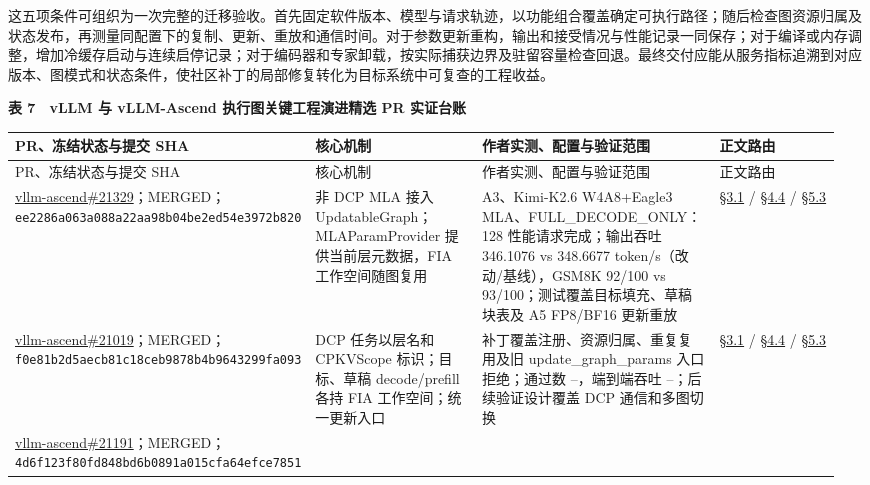 \documentclass[UTF8,10.5pt,fontset=windows]{ctexart}
\newcommand{\TableTitle}[1]{\par\Needspace{5\baselineskip}\begingroup\centering\bfseries\fontsize{9.5}{13}\selectfont #1\par\endgroup\nobreak}
\begin{document}
这五项条件可组织为一次完整的迁移验收。首先固定软件版本、模型与请求轨迹，以功能组合覆盖确定可执行路径；随后检查图资源归属及状态发布，再测量同配置下的复制、更新、重放和通信时间。对于参数更新重构，输出和接受情况与性能记录一同保存；对于编译或内存调整，增加冷缓存启动与连续启停记录；对于编码器和专家卸载，按实际捕获边界及驻留容量检查回退。最终交付应能从服务指标追溯到对应版本、图模式和状态条件，使社区补丁的局部修复转化为目标系统中可复查的工程收益。

\begin{landscape}
\begingroup
\fontsize{8.6}{11.8}\selectfont
\setlength{\tabcolsep}{2.5pt}
\setlength{\emergencystretch}{0.5\linewidth}
\renewcommand{\arraystretch}{1.10}
\TableTitle{\textbf{表 7　vLLM 与 vLLM-Ascend 执行图关键工程演进精选 PR 实证台账}}
\begin{longtable}[c]{@{}>{\raggedright\arraybackslash}p{0.2112\linewidth}
>{\raggedright\arraybackslash}p{0.2208\linewidth}
>{\raggedright\arraybackslash}p{0.3264\linewidth}
>{\raggedright\arraybackslash}p{0.2016\linewidth}@{}}
\toprule
PR、冻结状态与提交 SHA & 核心机制 & 作者实测、配置与验证范围 &
正文路由 \\
\midrule\endfirsthead
\toprule
PR、冻结状态与提交 SHA & 核心机制 & 作者实测、配置与验证范围 &
正文路由 \\
\midrule\endhead
\bottomrule\endfoot
\bottomrule\endlastfoot
\href{https://github.com/vllm-project/vllm-ascend/pull/21329}{vllm-ascend\#21329}；MERGED；\nolinkurl{ee2286a063a088a22aa98b04be2ed54e3972b820}
& 非 DCP MLA 接入 UpdatableGraph；MLAParamProvider 提供当前层元数据，FIA
工作空间随图复用 & A3、Kimi-K2.6 W4A8+Eagle3
MLA、FULL\_DECODE\_ONLY：128 性能请求完成；输出吞吐 346.1076 vs 348.6677
token/s（改动/基线），GSM8K 92/100 vs
93/100；测试覆盖目标填充、草稿块表及 A5 FP8/BF16 更新重放 &
\protect\hyperlink{section-3-1}{§3.1} /
\protect\hyperlink{section-4-4}{§4.4} /
\protect\hyperlink{section-5-3}{§5.3} \\
\href{https://github.com/vllm-project/vllm-ascend/pull/21019}{vllm-ascend\#21019}；MERGED；\nolinkurl{f0e81b2d5aecb81c18ceb9878b4b9643299fa093}
& DCP 任务以层名和 CPKVScope 标识；目标、草稿 decode/prefill 各持 FIA
工作空间；统一更新入口 & 补丁覆盖注册、资源归属、重复复用及旧
update\_graph\_params 入口拒绝；通过数 --，端到端吞吐
--；后续验证设计覆盖 DCP 通信和多图切换 &
\protect\hyperlink{section-3-1}{§3.1} /
\protect\hyperlink{section-4-4}{§4.4} /
\protect\hyperlink{section-5-3}{§5.3} \\
\href{https://github.com/vllm-project/vllm-ascend/pull/21191}{vllm-ascend\#21191}；MERGED；\nolinkurl{4d6f123f80fd848bd6b0891a015cfa64efce7851}

\end{longtable}
\end{landscape}
\end{document}
